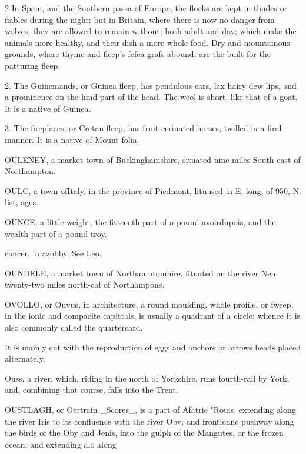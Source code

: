 \documentclass[10pt]{article}
\begin{document}
\begin{multicols}{2}
In Spain, and the Southern passa of Europe, the flocks are kept in thudes or fiables during the night; but in Britain, where there is now no danger from wolves, they are allowed to remain without; both adult and day; which make the animals more healthy, and their dish a more whole food. Dry and mountainous grounds, where thyme and fleep's fefea grafs abound, are the built for the patturing fleep.

2. The Guinemands, or Guinea fleep, has pendulous ears, lax hairy dew lips, and a prominence on the hind part of the head. The weol is short, like that of a goat. It is a native of Guinea.

3. The fireplaces, or Cretan fleep, has fruit cerinated horses, twilled in a firal manner. It is a native of Mount folia.

OULENEY, a market-town of Buckinghamshire, situated nine miles South-east of Northampton.

OULC, a town ofItaly, in the province of Piedmont, lituused in E, long, of 950, N. list, ages.

OUNCE, a little weight, the fitteenth part of a pound avoirdupois, and the wealth part of a pound troy.

cancer, in azobby. See Leo.

OUNDELE, a market town of Northamptomhire, fituated on the river Nen, twenty-two miles north-caf of Northampons.

OVOLLO, or Ouvus, in architecture, a round moulding, whole profile, or fweep, in the ionic and compacite capittals, is usually a quadrant of a circle; whence it is also commonly called the quartercard.

It is mainly cut with the reproduction of eggs and anchors or arrows heads placed alternately.

Ouss, a river, which, riding in the north of Yorkshire, runs fourth-rail by York; and, combining that course, falls into the Trent.

OUSTLAGH, or Oertrain \_Scores\_, is a part of Afatrie "Rouis, extending along the river Iris to its confluence with the river Obv, and frontienne pushway along the birds of the Oby and Jenis, into the gulph of the Mangutes, or the frozen ocean; and extending alo along

\end{multicols}
\end{document}
